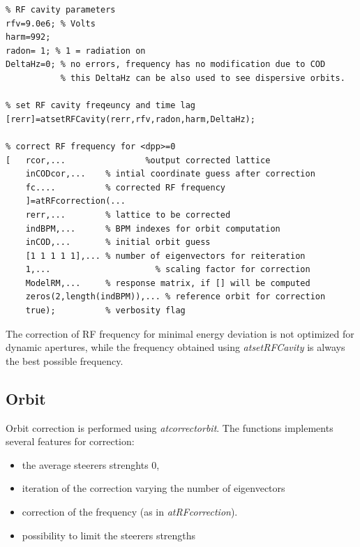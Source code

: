 \begin{lstlisting}
% RF cavity parameters
rfv=9.0e6; % Volts
harm=992; 
radon= 1; % 1 = radiation on
DeltaHz=0; % no errors, frequency has no modification due to COD
           % this DeltaHz can be also used to see dispersive orbits.
					
% set RF cavity freqeuncy and time lag
[rerr]=atsetRFCavity(rerr,rfv,radon,harm,DeltaHz);

% correct RF frequency for <dpp>=0
[   rcor,...				%output corrected lattice
    inCODcor,...    % intial coordinate guess after correction
    fc....          % corrected RF frequency
    ]=atRFcorrection(...
    rerr,...        % lattice to be corrected
    indBPM,...      % BPM indexes for orbit computation
    inCOD,...       % initial orbit guess
    [1 1 1 1 1],... % number of eigenvectors for reiteration
    1,...					  % scaling factor for correction
    ModelRM,...     % response matrix, if [] will be computed
    zeros(2,length(indBPM)),... % reference orbit for correction
    true);          % verbosity flag

\end{lstlisting}

The correction of RF frequency for minimal energy deviation is not optimized for dynamic apertures, while the frequency obtained using \emph{atsetRFCavity} is always the best possible frequency.

\clearpage
\subsection{Orbit}

Orbit correction is performed using \emph{atcorrectorbit}. The functions implements several features for  correction:
\begin{itemize}
\item the average steerers strenghts 0, 
\item iteration of the correction varying the number of eigenvectors 
\item correction of the frequency (as in \emph{atRFcorrection}).
\item possibility to limit the steerers strengths
\end{itemize}


